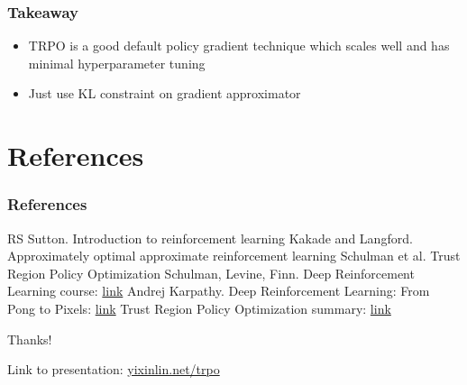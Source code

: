\documentclass{beamer}
\begin{document}
\begin{frame}
  \frametitle{Takeaway}
  \begin{itemize}
    \item TRPO is a good default policy gradient technique which scales well and has minimal hyperparameter tuning
    \item Just use KL constraint on gradient approximator
  \end{itemize}
\end{frame}



\section{References}

\begin{frame}
  \frametitle{References}
  \footnotesize{
    \begin{thebibliography}{99} %
      \bibitem[]{} RS Sutton. Introduction to reinforcement learning
      \bibitem[]{} Kakade and Langford. Approximately optimal approximate reinforcement learning
      \bibitem[]{} Schulman et al. Trust Region Policy Optimization
      \bibitem[]{} Schulman, Levine, Finn. Deep Reinforcement Learning course: \href{http://rll.berkeley.edu/deeprlcourse/}{link}
      \bibitem[]{} Andrej Karpathy. Deep Reinforcement Learning: From Pong to Pixels: \href{http://karpathy.github.io/2016/05/31/rl/}{link}
      \bibitem[]{} Trust Region Policy Optimization summary: \href{https://jmk.pe.kr/media/attachments/5bcf0aca45da310a434bbc093799c85e/trpo.pdf}{link}
  \end{thebibliography}
}
\end{frame}


\begin{frame}
  \Huge{\centerline{Thanks!}}
  
  \Large{\centerline{Link to presentation: \href{http://yixinlin.net/trpo}{yixinlin.net/trpo}}}
\end{frame}

\end{document}

